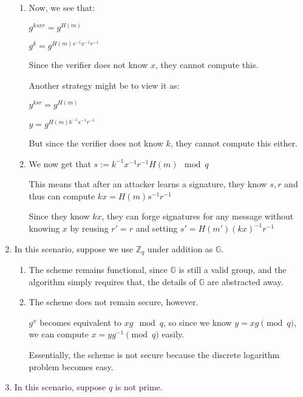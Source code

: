 \begin{enumerate}
        \begin{enumerate}
          \item
            Now, we see that:

            $g^{ksxr} = g^{H(m)}$

            $g^{k} = g^{H(m)s^{-1}x^{-1}r^{-1}}$

            Since the verifier does not know $x$, they cannot compute this.

            Another strategy might be to view it as:

            $y^{ksr} = g^{H(m)}$

            $y = g^{H(m)k^{-1}s^{-1}r^{-1}}$

            But since the verifier does not know $k$, they cannot compute this either.

          \item
            We now get that $s := k^{-1}x^{-1}r^{-1}H(m) \mod q$

            This means that after an attacker learns a signature, they know $s, r$ and thus can compute $kx = H(m)s^{-1}r^{-1}$

            Since they know $kx$, they can forge signatures for any message without knowing $x$ by reusing $r' = r$ and setting $s' = H(m')(kx)^{-1}r^{-1}$
        \end{enumerate}

      \item
        In this scenario, suppose we use $\mathbb{Z}_q$ under addition as $\mathbb{G}$.

        \begin{enumerate}
          \item
            The scheme remains functional, since $\mathbb{G}$ is still a valid group, and the algorithm simply requires that, the details of $\mathbb{G}$ are abstracted away.

          \item
            The scheme does not remain secure, however.

            $g^x$ becomes equivalent to $xg \mod q$, so since we know $y = xg \pmod{q}$, we can compute $x = yg^{-1} \pmod{q}$ easily.

            Essentially, the scheme is not secure because the discrete logarithm problem becomes easy.
        \end{enumerate}

      \item

        In this scenario, suppose $q$ is not prime.


\end{enumerate}
